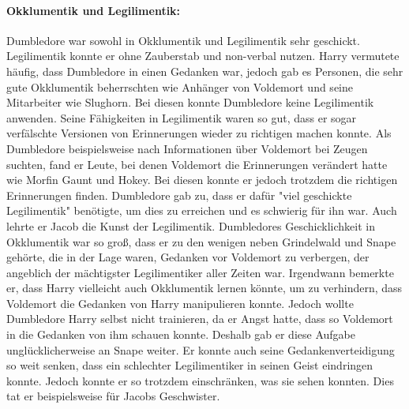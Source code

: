 \documentclass[a4paper, 10pt]{article}
\begin{document}
\paragraph{Okklumentik und Legilimentik:}
Dumbledore war sowohl in Okklumentik und Legilimentik sehr geschickt. Legilimentik konnte er ohne Zauberstab und non-verbal nutzen. Harry vermutete häufig, dass Dumbledore in einen Gedanken war, jedoch gab es Personen, die sehr gute Okklumentik beherrschten wie Anhänger von Voldemort und seine Mitarbeiter wie Slughorn. Bei diesen konnte Dumbledore keine Legilimentik anwenden. Seine Fähigkeiten in Legilimentik waren so gut, dass er sogar verfälschte Versionen von Erinnerungen wieder zu richtigen machen konnte. Als Dumbledore beispielsweise nach Informationen über Voldemort bei Zeugen suchten, fand er Leute, bei denen Voldemort die Erinnerungen verändert hatte wie Morfin Gaunt und Hokey. Bei diesen konnte er jedoch trotzdem die richtigen Erinnerungen finden. Dumbledore gab zu, dass er dafür "viel geschickte Legilimentik" benötigte, um dies zu erreichen und es schwierig für ihn war. Auch lehrte er Jacob die Kunst der Legilimentik. Dumbledores Geschicklichkeit in Okklumentik war so groß, dass er zu den wenigen neben Grindelwald und Snape gehörte, die in der Lage waren, Gedanken vor Voldemort zu verbergen, der angeblich der mächtigster Legilimentiker aller Zeiten war. Irgendwann bemerkte er, dass Harry vielleicht auch Okklumentik lernen könnte, um zu verhindern, dass Voldemort die Gedanken von Harry manipulieren konnte. Jedoch wollte Dumbledore Harry selbst nicht trainieren, da er Angst hatte, dass so Voldemort in die Gedanken von ihm schauen konnte. Deshalb gab er diese Aufgabe unglücklicherweise an Snape weiter. Er konnte auch seine Gedankenverteidigung so weit senken, dass ein schlechter Legilimentiker in seinen Geist eindringen konnte. Jedoch konnte er so trotzdem einschränken, was sie sehen konnten. Dies tat er beispielsweise für Jacobs Geschwister.
\end{document}
